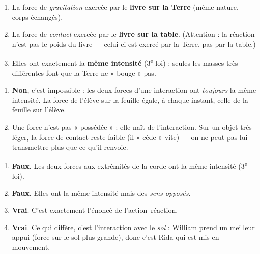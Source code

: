 \documentclass[11pt,a4paper]{article}
\begin{document}

\begin{corrige}
\begin{enumerate}[label=\alph*)]
  \item La force de \emph{gravitation} exercée par le \textbf{livre sur la Terre} (même nature, corps échangés).
  \item La force de \emph{contact} exercée par le \textbf{livre sur la table}. (Attention : la réaction n'est
        pas le poids du livre — celui-ci est exercé par la Terre, pas par la table.)
  \item Elles ont exactement la \textbf{même intensité} (3\textsuperscript{e} loi) ; seules les masses très
        différentes font que la Terre ne « bouge » pas.
\end{enumerate}
\end{corrige}

\begin{corrige}
\begin{enumerate}[label=\alph*)]
  \item \textbf{Non}, c'est impossible : les deux forces d'une interaction ont \emph{toujours} la même intensité.
        La force de l'élève sur la feuille égale, à chaque instant, celle de la feuille sur l'élève.
  \item Une force n'est pas « possédée » : elle naît de l'interaction. Sur un objet très léger, la force
        de contact reste faible (il « cède » vite) — on ne peut pas lui transmettre plus que ce qu'il renvoie.
\end{enumerate}
\end{corrige}

\begin{corrige}
\begin{enumerate}[label=\Alph*.]
  \item \textbf{Faux}. Les deux forces aux extrémités de la corde ont la même intensité (3\textsuperscript{e} loi).
  \item \textbf{Faux}. Elles ont la même intensité mais des \emph{sens opposés}.
  \item \textbf{Vrai}. C'est exactement l'énoncé de l'action--réaction.
  \item \textbf{Vrai}. Ce qui diffère, c'est l'interaction avec le \emph{sol} : William prend un meilleur appui
        (force sur le sol plus grande), donc c'est Rida qui est mis en mouvement.
\end{enumerate}
\end{corrige}
\end{document}
